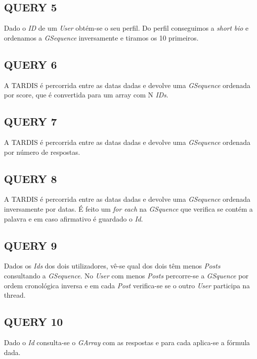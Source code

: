 \documentclass[letterpaper, 10 pt, conference]{IEEEtran}  %
\begin{document}
\subsection{QUERY 5}

Dado o \textit{ID} de um \textit{User} obtém-se o seu perfil. Do perfil conseguimos a \textit{short bio} e ordenamos a \textit{GSequence} inversamente e tiramos os 10 primeiros.

\subsection{QUERY 6}

A TARDIS é percorrida entre as datas dadas e devolve uma \textit{GSequence} ordenada por score, que é convertida para um array com N \textit{IDs}.

\subsection{QUERY 7}

A TARDIS é percorrida entre as datas dadas e devolve uma \textit{GSequence} ordenada por número de respostas.

\subsection{QUERY 8}

A TARDIS é percorrida entre as datas dadas e devolve uma \textit{GSequence} ordenada inversamente por datas. É feito um \textit{for each} na \textit{GSquence} que verifica se contém a palavra e em caso afirmativo é guardado o \textit{Id}.

\subsection{QUERY 9}

Dados os \textit{Ids} dos dois utilizadores, vê-se qual dos dois têm menos \textit{Posts} consultando a \textit{GSequence}. No \textit{User} com menos \textit{Posts} percorre-se a \textit{GSquence} por ordem cronológica inversa e em cada \textit{Post} verifica-se se o outro \textit{User} participa na thread.

\subsection{QUERY 10}

Dado o \textit{Id} consulta-se o \textit{GArray} com as respostas e para cada aplica-se a fórmula dada.
\end{document}
